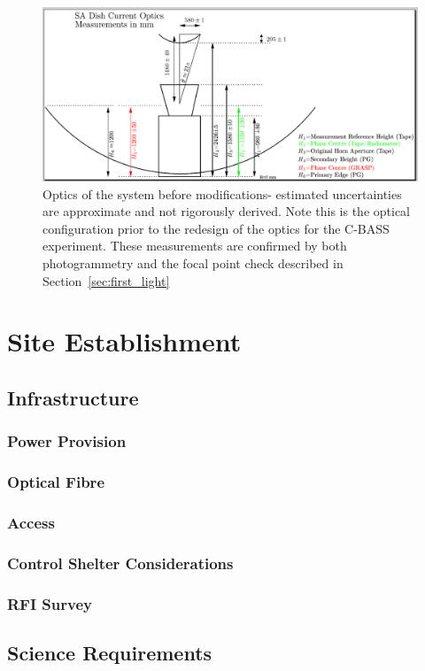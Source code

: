 \begin{figure}[ht]
 \centering
 \includegraphics[width=\textwidth]{images/optics/optics4_after.png}
 \caption{Optics of the system before modifications- estimated uncertainties are approximate and not rigorously derived. Note this is the optical configuration prior to the redesign of the optics for the C-BASS experiment. These measurements are confirmed by both photogrammetry and the focal point check described in Section~\ref{sec:first_light}}
 \label{fig:optics}
\end{figure}




\section{Site Establishment}
\subsection{Infrastructure}
  \subsubsection{Power Provision}
  \subsubsection{Optical Fibre}
  \subsubsection{Access}
    \subsubsection{Control Shelter Considerations}
    \subsubsection{RFI Survey}


\subsection{Science Requirements}
  


